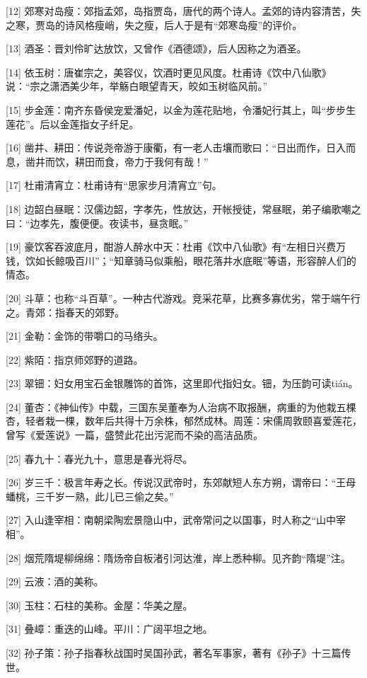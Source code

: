 \documentclass[12pt,UTF8]{ctexbook}
\begin{document}
[12] 郊寒对岛瘦：郊指孟郊，岛指贾岛，唐代的两个诗人。孟郊的诗内容清苦，失之寒，贾岛的诗风格瘦峭，失之瘦，后人于是有“郊寒岛瘦”的评价。

[13] 酒圣：晋刘伶旷达放饮，又曾作《酒德颂》，后人因称之为酒圣。

[14] 依玉树：唐崔宗之，美容仪，饮酒时更见风度。杜甫诗《饮中八仙歌》说：“宗之潇洒美少年，举觞白眼望青天，皎如玉树临风前。”

[15] 步金莲：南齐东昏侯宠爱潘妃，以金为莲花贴地，令潘妃行其上，叫“步步生莲花”。后以金莲指女子纤足。

[16] 凿井、耕田：传说尧帝游于康衢，有一老人击壤而歌曰：“日出而作，日入而息，凿井而饮，耕田而食，帝力于我何有哉！”

[17] 杜甫清宵立：杜甫诗有“思家步月清宵立”句。

[18] 边韶白昼眠：汉儒边韶，字孝先，性放达，开帐授徒，常昼眠，弟子编歌嘲之曰：“边孝先，腹便便。夜读书，昼贪眠。”

[19] 豪饮客吞波底月，酣游人醉水中天：杜甫《饮中八仙歌》有“左相日兴费万钱，饮如长鲸吸百川”；“知章骑马似乘船，眼花落井水底眠”等语，形容醉人们的情态。

[20] 斗草：也称“斗百草”。一种古代游戏。竞采花草，比赛多寡优劣，常于端午行之。青郊：指春天的郊野。

[21] 金勒：金饰的带嚼口的马络头。

[22] 紫陌：指京师郊野的道路。

[23] 翠钿：妇女用宝石金银雕饰的首饰，这里即代指妇女。钿，为压韵可读tián。

[24] 董杏：《神仙传》中载，三国东吴董奉为人治病不取报酬，病重的为他栽五棵杏，轻者栽一棵，数年后共得十万余株，郁然成林。周莲：宋儒周敦颐喜爱莲花，曾写《爱莲说》一篇，盛赞此花出污泥而不染的高洁品质。

[25] 春九十：春光九十，意思是春光将尽。

[26] 岁三千：极言年寿之长。传说汉武帝时，东郊献短人东方朔，谓帝曰：“王母蟠桃，三千岁一熟，此儿已三偷之矣。”

[27] 入山逢宰相：南朝梁陶宏景隐山中，武帝常问之以国事，时人称之“山中宰相”。

[28] 烟荒隋堤柳绵绵：隋炀帝自板渚引河达淮，岸上悉种柳。见齐韵“隋堤”注。

[29] 云液：酒的美称。

[30] 玉柱：石柱的美称。金屋：华美之屋。

[31] 叠嶂：重迭的山峰。平川：广阔平坦之地。

[32] 孙子策：孙子指春秋战国时吴国孙武，著名军事家，著有《孙子》十三篇传世。
\end{document}

